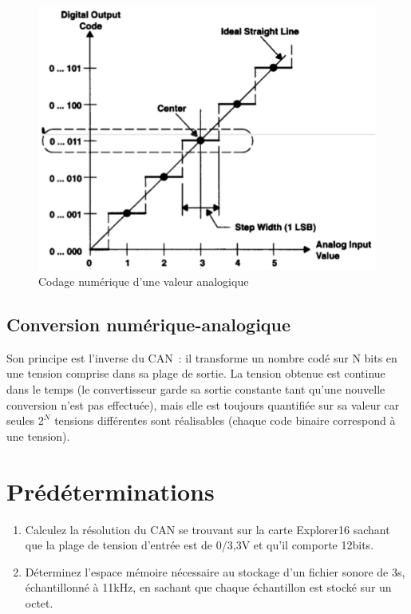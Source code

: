 \documentclass[11pt,a4paper]{article}
\theoremstyle{definition}%
\begin{document}
\begin{figure}
	\centering
	\includegraphics[width=.7\textwidth]{an-dig}
	\caption{Codage numérique d'une valeur analogique}
	\label{fig:an-dig}
\end{figure}

\subsection{Conversion numérique-analogique}
Son principe est l’inverse du CAN~: il transforme un nombre codé sur N bits en une tension comprise dans sa plage de sortie.
La tension obtenue est continue dans le temps (le convertisseur garde sa sortie constante tant qu’une nouvelle conversion n’est pas effectuée), mais elle est toujours quantifiée sur sa valeur car seules $2^N$ tensions différentes sont réalisables (chaque code binaire correspond à une tension).













\section{Prédéterminations}\label{sec:predet}
\begin{enumerate}
	\item Calculez la résolution du CAN se trouvant sur la carte Explorer16 sachant que la plage de tension d’entrée est de 0/3,3V et qu’il comporte 12bits.
	\item Déterminez l’espace mémoire nécessaire au stockage d’un fichier sonore de 3s, échantillonné à 11kHz, en sachant que chaque échantillon est stocké sur un octet.
\end{enumerate}
\end{document}
